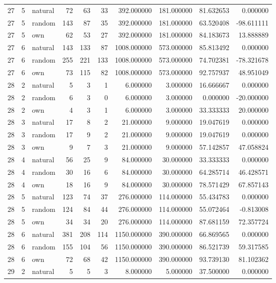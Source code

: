 \begin{table}[htbp]
\begin{tabular}{rrlrrrrrrr}
27 & 5 & natural & 72 & 63 & 33 & 392.000000 & 181.000000 & 81.632653 & 0.000000 \\
27 & 5 & random & 143 & 87 & 35 & 392.000000 & 181.000000 & 63.520408 & -98.611111 \\
27 & 5 & own & 62 & 53 & 27 & 392.000000 & 181.000000 & 84.183673 & 13.888889 \\
27 & 6 & natural & 143 & 133 & 87 & 1008.000000 & 573.000000 & 85.813492 & 0.000000 \\
27 & 6 & random & 255 & 221 & 133 & 1008.000000 & 573.000000 & 74.702381 & -78.321678 \\
27 & 6 & own & 73 & 115 & 82 & 1008.000000 & 573.000000 & 92.757937 & 48.951049 \\
28 & 2 & natural & 5 & 3 & 1 & 6.000000 & 3.000000 & 16.666667 & 0.000000 \\
28 & 2 & random & 6 & 3 & 0 & 6.000000 & 3.000000 & 0.000000 & -20.000000 \\
28 & 2 & own & 4 & 3 & 1 & 6.000000 & 3.000000 & 33.333333 & 20.000000 \\
28 & 3 & natural & 17 & 8 & 2 & 21.000000 & 9.000000 & 19.047619 & 0.000000 \\
28 & 3 & random & 17 & 9 & 2 & 21.000000 & 9.000000 & 19.047619 & 0.000000 \\
28 & 3 & own & 9 & 7 & 3 & 21.000000 & 9.000000 & 57.142857 & 47.058824 \\
28 & 4 & natural & 56 & 25 & 9 & 84.000000 & 30.000000 & 33.333333 & 0.000000 \\
28 & 4 & random & 30 & 16 & 6 & 84.000000 & 30.000000 & 64.285714 & 46.428571 \\
28 & 4 & own & 18 & 16 & 9 & 84.000000 & 30.000000 & 78.571429 & 67.857143 \\
28 & 5 & natural & 123 & 74 & 37 & 276.000000 & 114.000000 & 55.434783 & 0.000000 \\
28 & 5 & random & 124 & 84 & 44 & 276.000000 & 114.000000 & 55.072464 & -0.813008 \\
28 & 5 & own & 34 & 34 & 20 & 276.000000 & 114.000000 & 87.681159 & 72.357724 \\
28 & 6 & natural & 381 & 208 & 114 & 1150.000000 & 390.000000 & 66.869565 & 0.000000 \\
28 & 6 & random & 155 & 104 & 56 & 1150.000000 & 390.000000 & 86.521739 & 59.317585 \\
28 & 6 & own & 72 & 68 & 42 & 1150.000000 & 390.000000 & 93.739130 & 81.102362 \\
29 & 2 & natural & 5 & 5 & 3 & 8.000000 & 5.000000 & 37.500000 & 0.000000 \\

\end{tabular}
\end{table}
